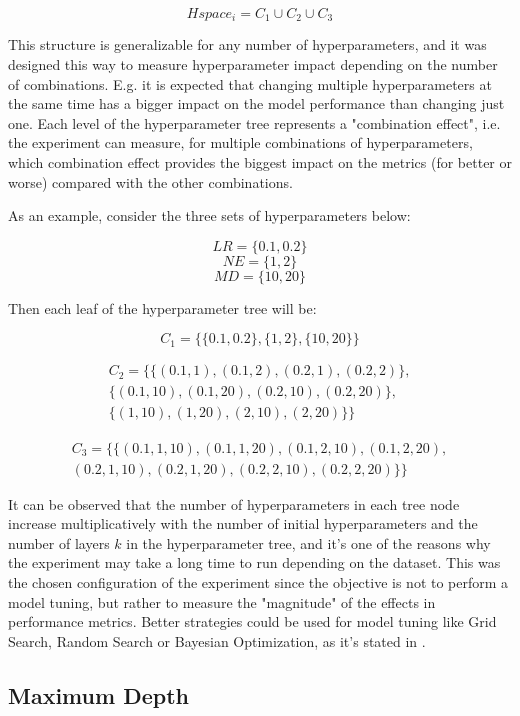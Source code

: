 $$Hspace_i = C_1 \cup C_2 \cup C_3$$

This structure is generalizable for any number of hyperparameters, and it was designed this way to measure hyperparameter impact depending on the number of combinations. E.g. it is expected that changing multiple hyperparameters at the same time has a bigger impact on the model performance than changing just one. Each level of the hyperparameter tree represents a "combination effect", i.e. the experiment can measure, for multiple combinations of hyperparameters, which combination effect provides the biggest impact on the metrics (for better or worse) compared with the other combinations.

As an example, consider the three sets of hyperparameters below:

$$LR = \{0.1, 0.2\}$$
$$NE = \{1, 2\}$$
$$MD = \{10, 20\}$$

Then each leaf of the hyperparameter tree will be:

$$C_1 = \Big\{\{0.1, 0.2\}, \{1, 2\}, \{10, 20\}\Big\}$$

\begin{align*}
    C_2 = \Big\{\{(0.1, 1), (0.1, 2), (0.2, 1), (0.2, 2)\}, \\
            \{(0.1, 10), (0.1, 20), (0.2, 10), (0.2, 20)\}, \\
            \{(1, 10), (1, 20), (2, 10), (2, 20)\}\Big\}
\end{align*}

\begin{align*}
    C_3 = \Big\{\{(0.1, 1, 10), (0.1, 1, 20), (0.1, 2, 10), (0.1, 2, 20), \\
    (0.2, 1, 10), (0.2, 1, 20), (0.2, 2, 10), (0.2, 2, 20)\}\Big\}
\end{align*}

It can be observed that the number of hyperparameters in each tree node increase multiplicatively with the number of initial hyperparameters and the number of layers $k$ in the hyperparameter tree, and it's one of the reasons why the experiment may take a long time to run depending on the dataset. This was the chosen configuration of the experiment since the objective is not to perform a model tuning, but rather to measure the "magnitude" of the effects in performance metrics. Better strategies could be used for model tuning like Grid Search, Random Search or Bayesian Optimization, as it's stated in \cite{probst2018tunability}.

\subsection{Maximum Depth}

